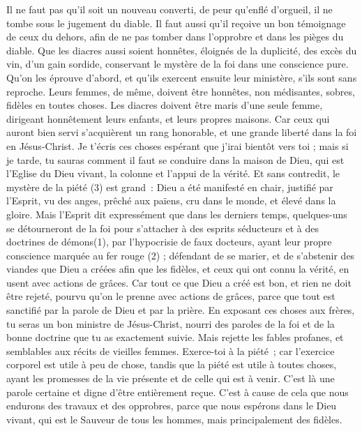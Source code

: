 \begin{multicols}{2}
Il ne faut pas qu’il soit un nouveau converti, de peur qu'enflé d'orgueil, il ne tombe sous le jugement du diable.
Il faut aussi qu'il reçoive un bon témoignage de ceux du dehors, afin de ne pas tomber dans l’opprobre et dans les pièges du diable.
Que les diacres aussi soient honnêtes, éloignés de la duplicité, des excès du vin, d’un gain sordide,
conservant le mystère de la foi dans une conscience pure.
Qu’on les éprouve d’abord, et qu’ils exercent ensuite leur ministère, s’ils sont sans reproche.
Leurs femmes, de même, doivent être honnêtes, non médisantes, sobres, fidèles en toutes choses.
Les diacres doivent être maris d'une seule femme, dirigeant honnêtement leurs enfants, et leurs propres maisons.
Car ceux qui auront bien servi s’acquièrent un rang honorable, et une grande liberté dans la foi en Jésus-Christ.
Je t'écris ces choses espérant que j'irai bientôt vers toi ;
mais si je tarde, tu sauras comment il faut se conduire dans la maison de Dieu, qui est l'Eglise du Dieu vivant, la colonne et l'appui de la vérité.
Et sans contredit, le mystère de la piété (3) est grand : Dieu a été manifesté en chair, justifié par l’Esprit, vu des anges, prêché aux païens, cru dans le monde, et élevé dans la gloire.
\VerseOne{}Mais l'Esprit dit expressément que dans les derniers temps, quelques-uns se détourneront de la foi pour s’attacher à des esprits séducteurs et à des doctrines de démons(1),
par l’hypocrisie de faux docteurs, ayant leur propre conscience marquée au fer rouge (2) ;
défendant de se marier, et de s'abstenir des viandes que Dieu a créées afin que les fidèles, et ceux qui ont connu la vérité, en usent avec actions de grâces.
Car tout ce que Dieu a créé est bon, et rien ne doit être rejeté, pourvu qu’on le prenne avec actions de grâces,
parce que tout est sanctifié par la parole de Dieu et par la prière.
En exposant ces choses aux frères, tu seras un bon ministre de Jésus-Christ, nourri des paroles de la foi et de la bonne doctrine que tu as exactement suivie.
Mais rejette les fables profanes, et semblables aux récits de vieilles femmes.
Exerce-toi à la piété ; car l'exercice corporel est utile à peu de chose, tandis que la piété est utile à toutes choses, ayant les promesses de la vie présente et de celle qui est à venir.
C'est là une parole certaine et digne d'être entièrement reçue.
C’est à cause de cela que nous endurons des travaux et des opprobres, parce que nous espérons dans le Dieu vivant, qui est le Sauveur de tous les hommes, mais principalement des fidèles.

\end{multicols}
